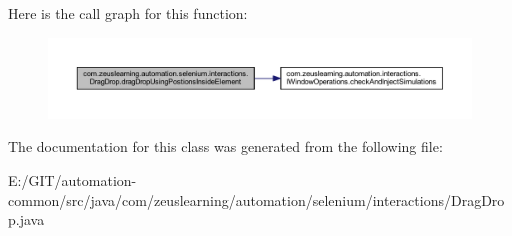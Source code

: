 Here is the call graph for this function\+:
\nopagebreak
\begin{figure}[H]
\begin{center}
\leavevmode
\includegraphics[width=350pt]{d3/d41/classcom_1_1zeuslearning_1_1automation_1_1selenium_1_1interactions_1_1DragDrop_aee8499d8e1f457ecfc20724aaf9ea535_cgraph}
\end{center}
\end{figure}


The documentation for this class was generated from the following file\+:\begin{DoxyCompactItemize}
\item 
E\+:/\+G\+I\+T/automation-\/common/src/java/com/zeuslearning/automation/selenium/interactions/Drag\+Drop.\+java\end{DoxyCompactItemize}
